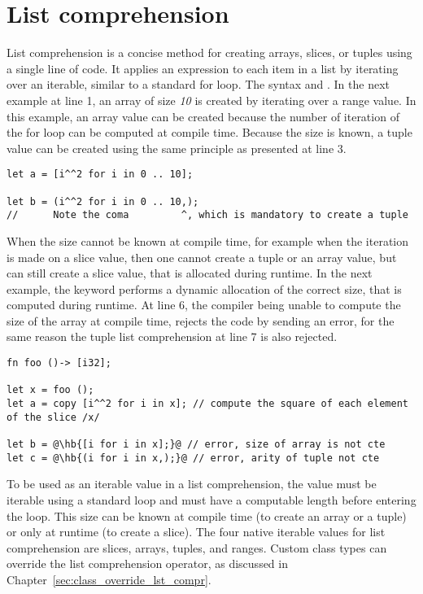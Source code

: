 \vfill%
\pagebreak

\section{List comprehension}%
\label{sec:list_compr}

List comprehension is a concise method for creating arrays, slices, or tuples
using a single line of code. It applies an expression to each item in a list by
iterating over an iterable, similar to a standard for loop. The syntax  and . In the next
example at line 1, an array of size \textit{10} is created by iterating over a
range value. In this example, an array value can be created because the number
of iteration of the for loop can be computed at compile time. Because the size
is known, a tuple value can be created using the same principle as presented at
line 3.

\begin{lstlisting}[style=coloredverbatim]
let a = [i^^2 for i in 0 .. 10];

let b = (i^^2 for i in 0 .. 10,);
//      Note the coma         ^, which is mandatory to create a tuple
\end{lstlisting}

When the size cannot be known at compile time, for example when the iteration is
made on a slice value, then one cannot create a tuple or an array value, but can
still create a slice value, that is allocated during runtime. In the next
example, the keyword  performs a dynamic allocation of the correct
size, that is computed during runtime. At line 6, the compiler being unable to
compute the size of the array at compile time, rejects the code by sending an
error, for the same reason the tuple list comprehension at line 7 is also
rejected.

\begin{lstlisting}[style=coloredverbatim, escapechar=@]
fn foo ()-> [i32];

let x = foo ();
let a = copy [i^^2 for i in x]; // compute the square of each element of the slice /x/

let b = @\hb{[i for i in x];}@ // error, size of array is not cte
let c = @\hb{(i for i in x,);}@ // error, arity of tuple not cte
\end{lstlisting}

To be used as an iterable value in a list comprehension, the value must be
iterable using a standard  loop and must have a computable length
before entering the loop. This size can be known at compile time (to create an
array or a tuple) or only at runtime (to create a slice). The four native
iterable values for list comprehension are slices, arrays, tuples, and ranges.
Custom class types can override the list comprehension operator, as discussed in
Chapter~\ref{sec:class_override_lst_compr}.


